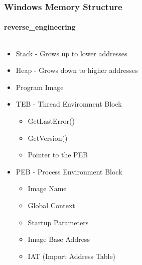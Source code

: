 \documentclass[aspectratio=169]{beamer}
\begin{document}
\begin{frame}
  \frametitle{Windows Memory Structure}
  \framesubtitle{reverse\_engineering}
  \begin{columns}
    \begin{column}{.6\textwidth}
      \begin{itemize}
      \item{Stack - Grows up to lower addresses}
      \item{Heap - Grows down to higher addresses}
      \item{Program Image}
      \item{TEB - Thread Environment Block}
        \begin{itemize}
        \item{GetLastError()}
        \item{GetVersion()}
        \item{Pointer to the PEB}
        \end{itemize}
      \item{PEB - Process Environment Block}
        \begin{itemize}
        \item{Image Name}
        \item{Global Context}
        \item{Startup Parameters}
        \item{Image Base Address}
        \item{IAT (Import Address Table)}
        \end{itemize}
      \end{itemize}
    \end{column}
    \hfill
    \begin{column}{.7\textwidth}
      \begin{center}

\end{center}
\end{column}
\end{columns}
\end{frame}
\end{document}
